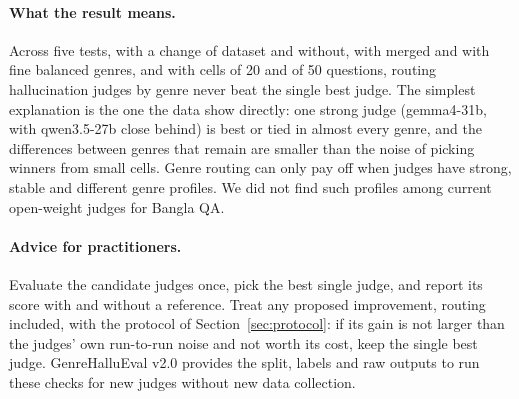 \documentclass[11pt]{article}
\begin{document}
\paragraph{What the result means.} Across five tests, with a change of dataset and without, with merged and with fine
balanced genres, and with cells of 20 and of 50 questions, routing hallucination judges by genre never beat the single
best judge. The simplest explanation is the one the data show directly: one strong judge (gemma4-31b, with qwen3.5-27b
close behind) is best or tied in almost every genre, and the differences between genres that remain are smaller than
the noise of picking winners from small cells. Genre routing can only pay off when judges have strong, stable and
different genre profiles. We did not find such profiles among current open-weight judges for Bangla QA.

\paragraph{Advice for practitioners.} Evaluate the candidate judges once, pick the best single judge, and report its
score with and without a reference. Treat any proposed improvement, routing included, with the protocol of
Section~\ref{sec:protocol}: if its gain is not larger than the judges' own run-to-run noise and not worth its cost,
keep the single best judge. GenreHalluEval v2.0 provides the split, labels and raw outputs to run these checks for new
judges without new data collection.
\end{document}
